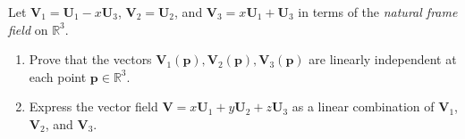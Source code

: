 \documentclass[12 pt, letterpaper]{hmcpset}
\begin{document}
\begin{problem}[Problem 1.]
	Let $\mathbf V_1 = \mathbf U_1 - x \mathbf U_3$, $\mathbf V_2 = \mathbf U_2$, and $\mathbf V_3 = x \mathbf U_1 + \mathbf U_3$ in terms of the \textit{natural frame field} on $\mathbb R^3$.
	\begin{enumerate}
		\item Prove that the vectors $\mathbf V_1 (\mathbf p), \mathbf V_2(\mathbf p), \mathbf V_3(\mathbf p)$ are linearly independent at each point $\mathbf p \in \mathbb R^3$.
		\item Express the vector field $\mathbf V  = x \mathbf U_1 + y \mathbf U_2 + z \mathbf U_3$ as a linear combination of $\mathbf V_1$, $\mathbf V_2$, and $\mathbf V_3$.
	\end{enumerate}
\end{problem}
\end{document}
